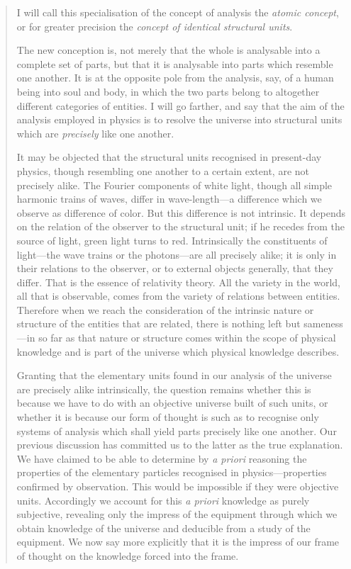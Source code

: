 \begin{quote}
    I will call this specialisation of the concept of analysis the \emph{atomic concept}, or for greater precision the \emph{concept of identical structural units}.

    The new conception is, not merely that the whole is analysable into a complete set of parts, but that it is analysable into parts which resemble one another.  It is at the opposite pole from the analysis, say, of a human being into soul and body, in which the two parts belong to altogether different categories of entities.  I will go farther, and say that the aim of the analysis employed in physics is to resolve the universe into structural units which are \emph{precisely} like one another.

    It may be objected that the structural units recognised in present-day physics, though resembling one another to a certain extent, are not precisely alike.  The Fourier components of white light, though all simple harmonic trains of waves, differ in wave-length---a difference which we observe as difference of color.  But this difference is not intrinsic.  It depends on the relation of the observer to the structural unit; if he recedes from the source of light, green light turns to red.  Intrinsically the constituents of light---the wave trains or the photons---are all precisely alike; it is only in their relations to the observer, or to external objects generally, that they differ.  That is the essence of relativity theory.  All the variety in the world, all that is observable, comes from the variety of relations between entities.  Therefore when we reach the consideration of the intrinsic nature or structure of the entities that are related, there is nothing left but sameness---in so far as that nature or structure comes within the scope of physical knowledge and is part of the universe which physical knowledge describes.  

    Granting that the elementary units found in our analysis of the universe are precisely alike intrinsically, the question remains whether this is because we have to do with an objective universe built of such units, or whether it is because our form of thought is such as to recognise only systems of analysis which shall yield parts precisely like one another.  Our previous discussion has committed us to the latter as the true explanation.  We have claimed to be able to determine by \emph{a priori} reasoning the properties of the elementary particles recognised in physics---properties confirmed by observation.  This would be impossible if they were objective units.  Accordingly we account for this \emph{a priori} knowledge as purely subjective, revealing only the impress of the equipment through which we obtain knowledge of the universe and deducible from a study of the equipment.  We now say more explicitly that it is the impress of our frame of thought on the knowledge forced into the frame.


\end{quote}

